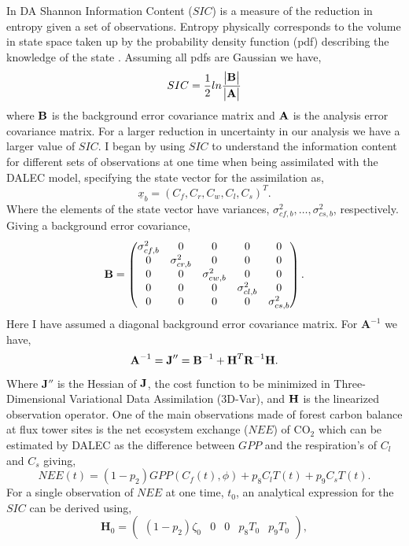 \documentclass[11pt]{article}
\begin{document}
In DA Shannon Information Content ($SIC$) is a measure of the reduction in entropy given a set of observations. Entropy physically corresponds to the volume in state space taken up by the probability density function (pdf) describing the knowledge of the state \cite{rodgers2000inverse}. Assuming all pdfs are Gaussian we have,
\[
SIC=\frac{1}{2}ln\frac{\begin{vmatrix} \bf{B} \end{vmatrix}}{\begin{vmatrix} \bf{A} \end{vmatrix}}
\]
where $\bf{B}$ is the background error covariance matrix and $\bf{A}$ is the analysis error covariance matrix. For a larger reduction in uncertainty in our analysis we have a larger value of $SIC$. I began by using $SIC$ to understand the information content for different sets of observations at one time when being assimilated with the DALEC model, specifying the state vector for the assimilation as,
\[ \underline{x}_b = (C_f, C_r, C_w, C_l, C_s)^T. \] 
Where the elements of the state vector have variances, $\sigma_{cf,b}^{2},\ldots,\sigma_{cs,b}^{2}$, respectively. Giving a background error covariance,
\[
\bf{B} = \begin{pmatrix} 
\sigma_{cf,b}^{2} & 0 & 0 & 0 & 0 \\
0 & \sigma_{cr,b}^{2} & 0 & 0 & 0 \\
0 & 0 & \sigma_{cw,b}^{2} & 0 & 0 \\
0 & 0 & 0 & \sigma_{cl,b}^{2} & 0 \\
0 & 0 & 0 & 0 & \sigma_{cs,b}^{2} \\
\end{pmatrix}.
\]  
Here I have assumed a diagonal background error covariance matrix. For $\textbf{A}^{-1}$ we have,
\[
\textbf{A}^{-1}=\textbf{J}'' = \textbf{B}^{-1}+\textbf{H}^{T}\textbf{R}^{-1}\bf{H}. 
\]
Where $\textbf{J}''$ is the Hessian of $\bf{J}$, the cost function to be minimized in Three-Dimensional Variational Data Assimilation (3D-Var), and $\bf{H}$ is the linearized observation operator. One of the main observations made of forest carbon balance at flux tower sites is the net ecosystem exchange ($NEE$) of CO$_{2}$ which can be estimated by DALEC as the difference between $GPP$ and the respiration's of $C_l$ and $C_s$ giving,
\[ 
NEE(t)=(1-p_2)GPP(C_f(t),\phi)+p_8C_lT(t)+p_9C_sT(t). 
\]
For a single observation of $NEE$ at one time, $t_0$, an analytical expression for the $SIC$ can be derived using,
\[
\textbf{H}_{0} = \begin{pmatrix}
(1-p_{2})\zeta_0 & 0 & 0 & p_{8}T_{0} & p_{9}T_{0}
\end{pmatrix},
\]  
\end{document}
